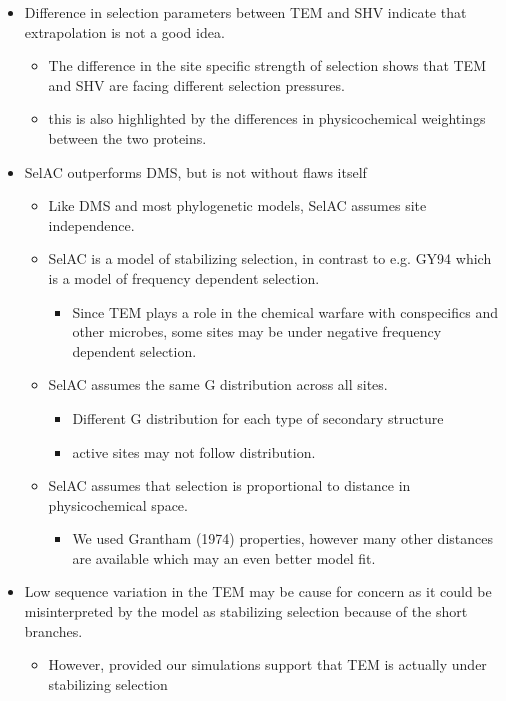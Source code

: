 \documentclass[12pt]{article}
\begin{document}
\begin{itemize}
	\item Difference in selection parameters between TEM and SHV indicate that extrapolation is not a good idea.
	\begin{itemize}
		\item The difference in the site specific strength of selection shows that TEM and SHV are facing different selection pressures.
		\item this is also highlighted by the differences in physicochemical weightings between the two proteins.
	\end{itemize}

	\item SelAC outperforms DMS, but is not without flaws itself
	\begin{itemize}
		\item Like DMS and most phylogenetic models, SelAC assumes site independence.
		\item SelAC is a model of stabilizing selection, in contrast to e.g. GY94 which is a model of frequency dependent selection.
		\begin{itemize}
			\item Since TEM plays a role in the chemical warfare with conspecifics and other microbes, some sites may be under negative frequency dependent selection.
		\end{itemize}
		\item SelAC assumes the same G distribution across all sites.
		\begin{itemize}
			\item Different G distribution for each type of secondary structure
			\item active sites may not follow distribution.
		\end{itemize}
		\item SelAC assumes that selection is proportional to distance in physicochemical space. 
		\begin{itemize}
			\item We used Grantham (1974) properties, however many other distances are available which may an even better model fit.
		\end{itemize}
	\end{itemize}
	\item Low sequence variation in the TEM may be cause for concern as it could be misinterpreted by the model as stabilizing selection because of the short branches.
	\begin{itemize}
		\item However, provided our simulations support that TEM is actually under stabilizing selection
	\end{itemize}


\end{itemize}
\end{document}
